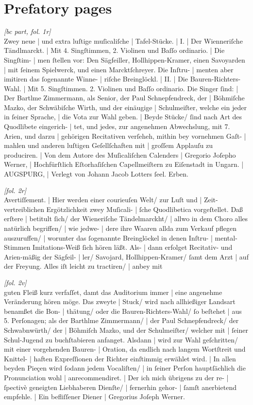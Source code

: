 \documentclass{ees}
\begin{document}
\clearscrheadfoot

\chapter{Prefatory pages}

\textit{[bc part, fol. 1r]}\\
Zwey neue | und extra luſtige muſicaliſche | Tafel-Stücke. | I. | Der Wienneriſche Tändlmarckt. | Mit 4. Singſtimmen, 2. Violinen und Baſſo ordinario. | Die Singſtim- | men ſtellen vor: Den Sägfeiller, Hollhippen-Kramer, einen Savoyarden | mit ſeinem Spielwerck, und einen Marcktſchreyer. Die Inſtru- | menten aber imitiren das ſogenannte Winne- | riſche Breinglöckl. | II. | Die Bauren-Richters-Wahl. | Mit 5. Singſtimmen. 2. Violinen und Baſſo ordinario. Die Singer ſind: | Der Bartlme Zimmermann, als Senior, der Paul Schnepfendreck, der | Böhmiſche Mazko, der Schwäbiſche Wirth, und der einäugige | Schulmeiſter, welche ein jeder in ſeiner Sprache, | die Vota zur Wahl geben. | Beyde Stücke/ ſind nach Art des Quodlibete eingerich- | tet, und jedes, zur angenehmen Abwechslung, mit 7. Arien, und darzu | gehörigen Recitativen verſeheh, mithin bey vornehmen Gaſt- | mahlen und anderen luſtigen Geſellſchaften mit | groſſem Applauſu zu produciren. | Von dem Autore des Muſicaliſchen Calenders | Gregorio Joſepho Werner, | Hochfürſtlich Eſtorhaſiſchen Capellmeiſtern zu Eiſenstadt in Ungarn. | AUGSPURG, | Verlegt von Johann Jacob Lotters ſeel. Erben.

\textit{[fol. 2r]}\\
Avertiſſement. | Hier werden einer courieuſen Welt/ zur Luſt und | Zeit-vertreiblichen Ergötzlichkeit zwey Muſicali- | ſche Quodlibetica vorgeſtellet. Daß erſtere | betitult ſich/ der Wieneriſche Tändelmarckht/ | allwo in dem Choro alles natürlich begriffen/ | wie jedwe- | dere ihre Waaren allda zum Verkauf pflegen auszuruffen/ | worunter das ſogenannte Breinglöckel in denen Inſtru- | mental-Stimmen Imitations-Weiß ſich hören läßt. Als- | dann erfolget Recitativ- und Arien-mäßig der Sägfeil- | ler/ Savojard, Hollhippen-Kramer/ ſamt dem Arzt | auf der Freyung. Alles iſt leicht zu tractiren/ | anbey mit

\textit{[fol. 2v]}\\
guten Fleiß kurz verfaſſet, damt das Auditorium immer | eine angenehme Veränderung hören möge. Das zweyte | Stuck/ wird nach allhießiger Landsart benamßet die Bon- | thätung/ oder die Bauren-Richters-Wahl/ ſo beſtehet | aus 5. Perſonagen; als der Barthlme Zimmermann/ | der Paul Schnepfendreck/ der Schwabnwürth/ der | Böhmiſch Mazko, und der Schulmeiſter/ welcher mit | ſeiner Schul-Jugend zu buchſtabieren anfanget. Alsdann | wird zur Wahl geſchritten/ mit einer vorgehenden Bauren- | Oration, da endlich nach langem Wortſtreit und Knittel- | haften Expreſſionen der Richter einſtimmig erwählet wird. | In allen beyden Pieçen wird ſodann jedem Vocaliſten/ | in ſeiner Perſon hauptſächlich die Pronunciation wohl | anrecommendiret. | Der ich mich übrigens zu der re- | ſpectivè geneigten Liebhaberen Dienſte/ | fernerhin gehor- | ſamſt anerbietend empfehle. | Ein befliſſener Diener | Gregorius Joſeph Werner.
\end{document}
